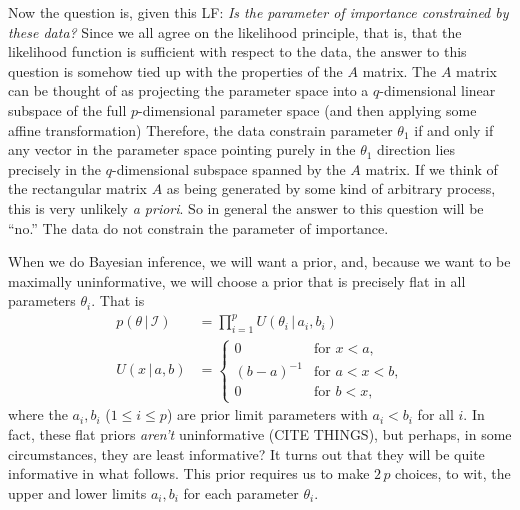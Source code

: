 \documentclass[10pt]{article}
\newcommand{\foreign}[1]{\textsl{#1}}
\newcommand{\given}{\,|\,}
\begin{document}
Now the question is, given this LF: \emph{Is the parameter of importance constrained by these data?}
Since we all agree on the likelihood principle, that is, that the likelihood function is sufficient with respect to the data,
the answer to this question is somehow tied up with the properties of the $A$ matrix.
The $A$ matrix can be thought of as projecting the parameter space into a $q$-dimensional linear subspace of the full $p$-dimensional parameter space (and then applying some affine transformation)
Therefore, the data constrain parameter $\theta_1$ if and only if any vector in the parameter space pointing purely in the $\theta_1$ direction lies precisely in the $q$-dimensional subspace spanned by the $A$ matrix.
If we think of the rectangular matrix $A$ as being generated by some kind of arbitrary process, this is very unlikely \foreign{a priori}.
So in general the answer to this question will be ``no.''
The data do not constrain the parameter of importance.

When we do Bayesian inference, we will want a prior, and, because we want to be maximally uninformative, we will choose a prior that is precisely flat in all parameters $\theta_i$.
That is
\begin{align}
    p(\theta\given\mathscr{I}) &= \prod_{i=1}^p U(\theta_i\given a_i, b_i) \\
    U(x\given a, b) & = \left\{\begin{array}{cl}
    0 & \mbox{for $x<a$,} \\
    (b-a)^{-1} & \mbox{for $a<x<b$,} \\
    0 & \mbox{for $b<x$,}\end{array}\right.
\end{align}
where the $a_i, b_i$ ($1\leq i\leq p$) are prior limit parameters with $a_i<b_i$ for all $i$.
In fact, these flat priors \emph{aren't} uninformative (CITE THINGS), but perhaps, in some circumstances, they are least informative?
It turns out that they will be quite informative in what follows.
This prior requires us to make $2\,p$ choices, to wit, the upper and lower limits $a_i, b_i$ for each parameter $\theta_i$.
\end{document}
